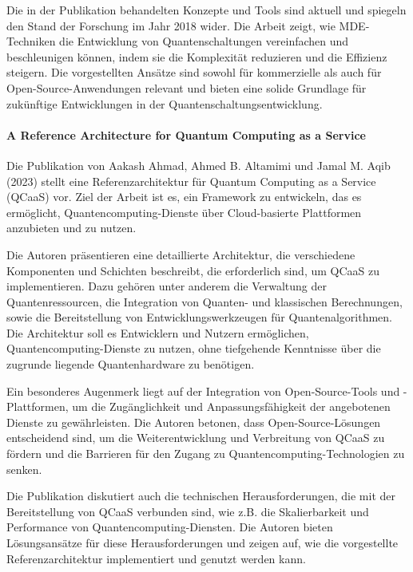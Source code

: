 Die in der Publikation behandelten Konzepte und Tools sind aktuell und spiegeln den Stand der Forschung im Jahr 2018 wider. 
Die Arbeit zeigt, wie MDE-Techniken die Entwicklung von Quantenschaltungen vereinfachen und beschleunigen können, indem 
sie die Komplexität reduzieren und die Effizienz steigern. Die vorgestellten Ansätze sind sowohl für 
kommerzielle als auch für Open-Source-Anwendungen relevant und bieten eine solide Grundlage für zukünftige Entwicklungen in der Quantenschaltungsentwicklung.

\paragraph{A Reference Architecture for Quantum Computing as a Service}

Die Publikation von Aakash Ahmad, Ahmed B. Altamimi und Jamal M. Aqib (2023) \cite{Ahmad_2023} stellt eine Referenzarchitektur 
für Quantum Computing as a Service (QCaaS) vor. Ziel der Arbeit ist es, ein Framework zu entwickeln, das es ermöglicht, 
Quantencomputing-Dienste über Cloud-basierte Plattformen anzubieten und zu nutzen.

Die Autoren präsentieren eine detaillierte Architektur, die verschiedene Komponenten und Schichten beschreibt, 
die erforderlich sind, um QCaaS zu implementieren. Dazu gehören unter anderem die Verwaltung der 
Quantenressourcen, die Integration von Quanten- und klassischen Berechnungen, sowie die Bereitstellung von 
Entwicklungswerkzeugen für Quantenalgorithmen. Die Architektur soll es Entwicklern und Nutzern 
ermöglichen, Quantencomputing-Dienste zu nutzen, ohne tiefgehende Kenntnisse über die zugrunde liegende Quantenhardware zu benötigen.

Ein besonderes Augenmerk liegt auf der Integration von Open-Source-Tools und -Plattformen, um die 
Zugänglichkeit und Anpassungsfähigkeit der angebotenen Dienste zu gewährleisten. Die Autoren betonen, 
dass Open-Source-Lösungen entscheidend sind, um die Weiterentwicklung und Verbreitung von QCaaS zu fördern und die 
Barrieren für den Zugang zu Quantencomputing-Technologien zu senken.

Die Publikation diskutiert auch die technischen Herausforderungen, die mit der Bereitstellung von QCaaS verbunden sind, 
wie z.B. die Skalierbarkeit und Performance von Quantencomputing-Diensten. Die Autoren bieten Lösungsansätze für diese 
Herausforderungen und zeigen auf, wie die vorgestellte Referenzarchitektur implementiert und genutzt werden kann.

